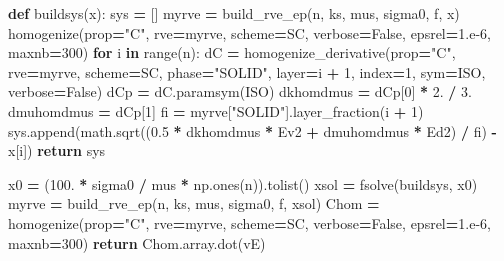 \documentclass[
  a4paper,
  numbers=noendperiod,
  DIV=12]{scrreprt}
\newenvironment{Shaded}{\begin{snugshade}}{\end{snugshade}}
\newcommand{\BuiltInTok}[1]{#1}
\newcommand{\ControlFlowTok}[1]{\textcolor[rgb]{0.13,0.29,0.53}{\textbf{#1}}}
\newcommand{\DecValTok}[1]{\textcolor[rgb]{0.00,0.00,0.81}{#1}}
\newcommand{\FloatTok}[1]{\textcolor[rgb]{0.00,0.00,0.81}{#1}}
\newcommand{\KeywordTok}[1]{\textcolor[rgb]{0.13,0.29,0.53}{\textbf{#1}}}
\newcommand{\NormalTok}[1]{#1}
\newcommand{\OperatorTok}[1]{\textcolor[rgb]{0.81,0.36,0.00}{\textbf{#1}}}
\newcommand{\StringTok}[1]{\textcolor[rgb]{0.31,0.60,0.02}{#1}}
\newcommand{\VariableTok}[1]{\textcolor[rgb]{0.00,0.00,0.00}{#1}}
\begin{document}
\begin{Shaded}
\begin{Highlighting}[]
    \KeywordTok{def}\NormalTok{ buildsys(x):}
\NormalTok{        sys }\OperatorTok{=}\NormalTok{ []}
\NormalTok{        myrve }\OperatorTok{=}\NormalTok{ build\_rve\_ep(n, ks, mus, sigma0, f, x)}
\NormalTok{        homogenize(prop}\OperatorTok{=}\StringTok{"C"}\NormalTok{, rve}\OperatorTok{=}\NormalTok{myrve, scheme}\OperatorTok{=}\NormalTok{SC,}
\NormalTok{                   verbose}\OperatorTok{=}\VariableTok{False}\NormalTok{, epsrel}\OperatorTok{=}\FloatTok{1.e{-}6}\NormalTok{, maxnb}\OperatorTok{=}\DecValTok{300}\NormalTok{)}
        \ControlFlowTok{for}\NormalTok{ i }\KeywordTok{in} \BuiltInTok{range}\NormalTok{(n):}
\NormalTok{            dC }\OperatorTok{=}\NormalTok{ homogenize\_derivative(prop}\OperatorTok{=}\StringTok{"C"}\NormalTok{, rve}\OperatorTok{=}\NormalTok{myrve, scheme}\OperatorTok{=}\NormalTok{SC,}
\NormalTok{                                        phase}\OperatorTok{=}\StringTok{"SOLID"}\NormalTok{, layer}\OperatorTok{=}\NormalTok{i }\OperatorTok{+} \DecValTok{1}\NormalTok{,}
\NormalTok{                                        index}\OperatorTok{=}\DecValTok{1}\NormalTok{, sym}\OperatorTok{=}\NormalTok{ISO, verbose}\OperatorTok{=}\VariableTok{False}\NormalTok{)}
\NormalTok{            dCp }\OperatorTok{=}\NormalTok{ dC.paramsym(ISO)}
\NormalTok{            dkhomdmus }\OperatorTok{=}\NormalTok{ dCp[}\DecValTok{0}\NormalTok{] }\OperatorTok{*} \FloatTok{2.} \OperatorTok{/} \FloatTok{3.}
\NormalTok{            dmuhomdmus }\OperatorTok{=}\NormalTok{ dCp[}\DecValTok{1}\NormalTok{]}
\NormalTok{            fi }\OperatorTok{=}\NormalTok{ myrve[}\StringTok{"SOLID"}\NormalTok{].layer\_fraction(i }\OperatorTok{+} \DecValTok{1}\NormalTok{)}
\NormalTok{            sys.append(math.sqrt((}\FloatTok{0.5} \OperatorTok{*}\NormalTok{ dkhomdmus }\OperatorTok{*}\NormalTok{ Ev2}
                                  \OperatorTok{+}\NormalTok{ dmuhomdmus }\OperatorTok{*}\NormalTok{ Ed2) }\OperatorTok{/}\NormalTok{ fi) }\OperatorTok{{-}}\NormalTok{ x[i])}
        \ControlFlowTok{return}\NormalTok{ sys}

\NormalTok{    x0 }\OperatorTok{=}\NormalTok{ (}\FloatTok{100.} \OperatorTok{*}\NormalTok{ sigma0 }\OperatorTok{/}\NormalTok{ mus }\OperatorTok{*}\NormalTok{ np.ones(n)).tolist()}
\NormalTok{    xsol }\OperatorTok{=}\NormalTok{ fsolve(buildsys, x0)}
\NormalTok{    myrve }\OperatorTok{=}\NormalTok{ build\_rve\_ep(n, ks, mus, sigma0, f, xsol)}
\NormalTok{    Chom }\OperatorTok{=}\NormalTok{ homogenize(prop}\OperatorTok{=}\StringTok{"C"}\NormalTok{, rve}\OperatorTok{=}\NormalTok{myrve, scheme}\OperatorTok{=}\NormalTok{SC,}
\NormalTok{                      verbose}\OperatorTok{=}\VariableTok{False}\NormalTok{, epsrel}\OperatorTok{=}\FloatTok{1.e{-}6}\NormalTok{, maxnb}\OperatorTok{=}\DecValTok{300}\NormalTok{)}
    \ControlFlowTok{return}\NormalTok{ Chom.array.dot(vE)}


\end{Highlighting}
\end{Shaded}
\end{document}

